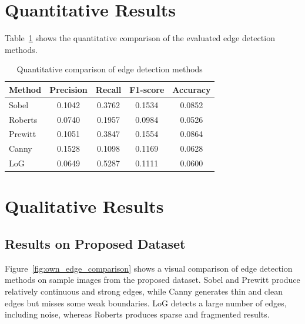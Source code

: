 \documentclass[12pt]{article}
\begin{document}
\section{Quantitative Results}

Table~\ref{tab:quant_results} shows the quantitative comparison of the evaluated edge detection methods.

\begin{table}[H]
\centering
\caption{Quantitative comparison of edge detection methods}
\label{tab:quant_results}
\begin{tabular}{lcccc}
\toprule
\textbf{Method} & \textbf{Precision} & \textbf{Recall} & \textbf{F1-score} & \textbf{Accuracy} \\
\midrule
Sobel   & 0.1042 & 0.3762 & 0.1534 & 0.0852 \\
Roberts & 0.0740 & 0.1957 & 0.0984 & 0.0526 \\
Prewitt & 0.1051 & 0.3847 & 0.1554 & 0.0864 \\
Canny   & 0.1528 & 0.1098 & 0.1169 & 0.0628 \\
LoG     & 0.0649 & 0.5287 & 0.1111 & 0.0600 \\
\bottomrule
\end{tabular}
\end{table}

\section{Qualitative Results}

\subsection{Results on Proposed Dataset}

Figure~\ref{fig:own_edge_comparison} shows a visual comparison of edge detection methods on sample images from the proposed dataset. 
Sobel and Prewitt produce relatively continuous and strong edges, while Canny generates thin and clean edges but misses some weak boundaries. 
LoG detects a large number of edges, including noise, whereas Roberts produces sparse and fragmented results.
\end{document}
